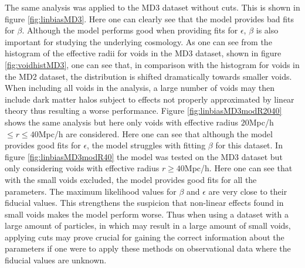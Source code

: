 The same analysis was applied to the MD3 dataset without cuts. This is shown in figure \ref{fig:linbiasMD3}. Here one can clearly see that the model provides bad fits for $\beta$. Although the model performs good when providing fits for $\epsilon$, $\beta$ is also important for studying the underlying cosmology. As one can see from the histogram of the effective radii for voids in the MD3 dataset, shown in figure \ref{fig:voidhistMD3}, one can see that, in comparison with the histogram for voids in the MD2 dataset, the distribution is shifted dramatically towards smaller voids. When including all voids in the analysis, a large number of voids may then include dark matter halos subject to effects not properly approximated by linear theory thus resulting a worse performance. Figure \ref{fig:linbiasMD3modR2040} shows the same analysis but here only voids with effective radius $20$Mpc/h$\leq r\leq 40$Mpc/h are considered. Here one can see that although the model provides good fits for $\epsilon$, the model struggles with fitting $\beta$ for this dataset. In figure \ref{fig:linbiasMD3modR40} the model was tested on the MD3 dataset but only considering voids with effective radius $r\geq 40$Mpc/h. Here one can see that with the small voids excluded, the model provides good fits for all the parameters. The maximum likelihood values for $\beta$ and $\epsilon$ are very close to their fiducial values. This strengthens the suspicion that non-linear effects found in small voids makes the model perform worse. Thus when using a dataset with a large amount of particles, in which may result in a large amount of small voids, applying cuts may prove crucial for gaining the correct information about the parameters if one were to apply these methods on observational data where the fiducial values are unknown. \\\indent
